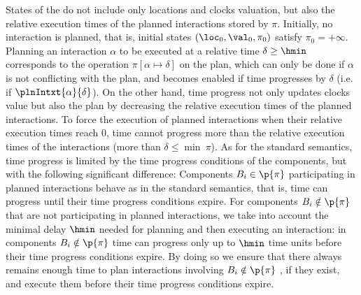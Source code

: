 States of the \lpsabr do not include only locations and clocks valuation, but also the relative execution times of the planned interactions stored by $\pi$.
Initially, no interaction is planned, that is, initial states $(\loc_0,\val_0,\pi_0)$ satisfy $\pi_0 = +\infty$.
Planning an interaction $\alpha$ to be executed at a relative time $\delta \geq \hmin$ corresponds to the operation $\pi [ \alpha\mapsto\delta ]$ on the plan, which can only be done if $\alpha$ is not conflicting with the plan, and becomes enabled if time progresses by $\delta$ (i.e. if $\plnIntxt{\alpha}{\delta}$).
On the other hand, time progress not only updates clocks value but also the plan by decreasing the relative execution times of the planned interactions.
To force the execution of planned interactions when their relative execution times reach $0$, time cannot progress more than the relative execution times of the interactions (more than $\delta \le \min \ \pi$).
As for the standard semantics, time progress is limited by the time progress conditions of the components, but with the following significant difference:
Components $B_i \in \p{\pi}$ participating in planned interactions behave as in the standard semantics, that is, time can progress until their time progress conditions expire.
For components $B_i \notin \p{\pi}$ that are not participating in planned interactions, we take into account the minimal delay $\hmin$ needed for planning and then executing an interaction: in components $B_i \notin \p{\pi}$ time can progress only up to $\hmin$ time units before their time progress conditions expire.
By doing so we ensure that there always remains enough time to plan interactions involving $B_i \notin \p{\pi}$ , if they exist, and execute them before their time progress conditions expire.
 
